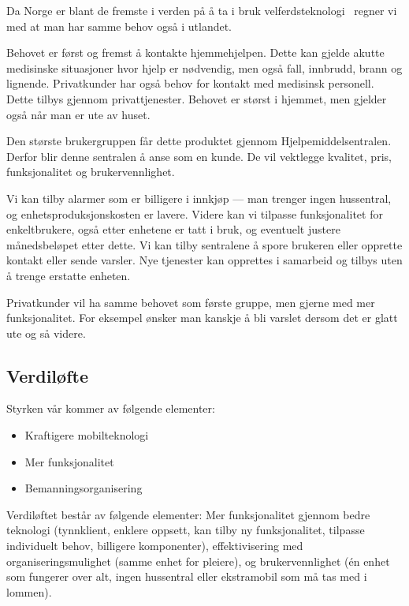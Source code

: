 Da Norge er blant de fremste i verden på å ta i bruk velferdsteknologi
\cite{telenor.undersokelse} regner vi med at man har samme behov også i
utlandet.

Behovet er først og fremst å kontakte hjemmehjelpen. Dette kan gjelde akutte
medisinske situasjoner hvor hjelp er nødvendig, men også fall, innbrudd, brann
og lignende. Privatkunder har også behov for kontakt med medisinsk personell.
Dette tilbys gjennom privattjenester. Behovet er størst i hjemmet, men gjelder
også når man er ute av huset.

Den største brukergruppen får dette produktet gjennom Hjelpemiddelsentralen.
Derfor blir denne sentralen å anse som en kunde. De vil vektlegge kvalitet,
pris, funksjonalitet og brukervennlighet.

Vi kan tilby alarmer som er billigere i innkjøp --- man trenger ingen
hussentral, og enhetsproduksjonskosten er lavere. Videre kan vi tilpasse
funksjonalitet for enkeltbrukere, også etter enhetene er tatt i bruk, og
eventuelt justere månedsbeløpet etter dette. Vi kan tilby sentralene å spore
brukeren eller opprette kontakt eller sende varsler.  Nye tjenester kan
opprettes i samarbeid og tilbys uten å trenge erstatte enheten.

Privatkunder vil ha samme behovet som første gruppe, men gjerne med mer
funksjonalitet. For eksempel ønsker man kanskje å bli varslet dersom det er
glatt ute og så videre.

\subsection{Verdiløfte}

Styrken vår kommer av følgende elementer:

\begin{itemize}
  \item Kraftigere mobilteknologi
  \item Mer funksjonalitet
  \item Bemanningsorganisering
\end{itemize}

Verdiløftet består av følgende elementer: Mer funksjonalitet gjennom bedre
teknologi (tynnklient, enklere oppsett, kan tilby ny funksjonalitet, tilpasse
individuelt behov, billigere komponenter), effektivisering med
organiseringsmulighet (samme enhet for pleiere), og brukervennlighet (én enhet
som fungerer over alt, ingen hussentral eller ekstramobil som må tas med i
lommen).


